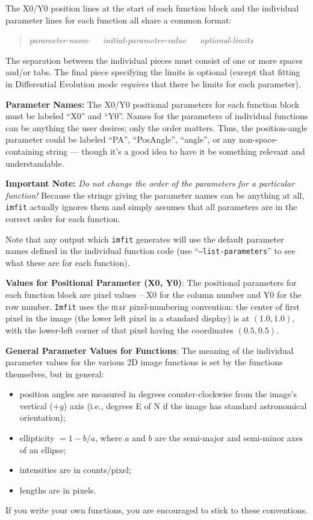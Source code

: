 \documentclass[10pt,a4paper,article]{memoir}
\newcommand{\imfit}{\texttt{imfit}}
\newcommand{\Imfit}{\texttt{Imfit}}
\begin{document}
The X0/Y0 position lines at the start of each function block and the
individual parameter lines for each function all share a common format:
\begin{quote}
\textit{parameter-name} ~~ \textit{initial-parameter-value} ~~ \textit{optional-limits}
\end{quote}
The separation between the individual pieces must consist of one or more spaces
and/or tabs. The final piece specifying the limits is optional (except that
fitting in Differential Evolution mode \textit{requires} that there be limits
for each parameter).

\bigskip

\textbf{Parameter Names:} The X0/Y0 positional parameters for each
function block must be labeled ``X0'' and ``Y0''. Names for the
parameters of individual functions can be anything the user desires;
only the order matters. Thus, the position-angle parameter could be
labeled ``PA'', ``PosAngle'', ``angle'', or any non-space-containing
string --- though it's a good idea to have it be something relevant
and understandable.

\textbf{Important Note:} \textit{Do not change the order of the parameters
for a particular function!}  Because the strings giving the parameter names
can be anything at all, \imfit{} actually ignores them and simply assumes
that all parameters are in the correct order for each function.

Note that any output which \imfit{} generates will use the default parameter
names defined in the individual function code (use ``\texttt{--list-parameters}''
to see what these are for each function).

\bigskip

\textbf{Values for Positional Parameter (X0, Y0)}: The positional parameters
for each function block are pixel values -- X0 for the column number and
Y0 for the row number. \Imfit{} uses the \textsc{iraf} pixel-numbering
convention: the center of first pixel in the image (the lower left pixel
in a standard display) is at $(1.0,1.0)$, with the lower-left corner of that
pixel having the coordinates $(0.5,0.5)$.

\bigskip

\textbf{General Parameter Values for Functions}: The meaning of the individual
parameter values for the various 2D image functions is set by the functions
themselves, but in general: 
\begin{itemize}
\item position angles are measured in degrees counter-clockwise
from the image's vertical ($+y$) axis (i.e., degrees E of N if the image has standard
astronomical orientation);
\item ellipticity $= 1 - b/a$, where $a$ and $b$ are the
semi-major and semi-minor axes of an ellipse;
\item intensities are in counts/pixel;
\item lengths are in pixels. 
\end{itemize}
If you write your own functions, you are encouraged
to stick to these conventions.
\end{document}
